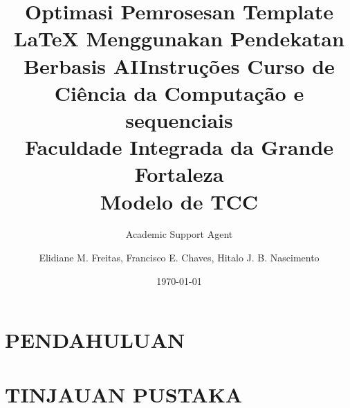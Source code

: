 \documentclass{article}
\title{Optimasi Pemrosesan Template LaTeX Menggunakan Pendekatan Berbasis AI}
\author{Academic Support Agent}
\date{\today}
\begin{document}
\maketitle

\begin{abstract}

\end{abstract}

\chapter{PENDAHULUAN}


\chapter{TINJAUAN PUSTAKA}



\usepackage{sbc-template}

\usepackage{graphicx,url}

\usepackage[brazil]{babel}   
\usepackage[utf8]{inputenc}  
\usepackage{verbatim}
\usepackage{listings}
\usepackage{xcolor}



\sloppy

\title{Instruções Curso de Ciência da Computação e sequenciais\\ Faculdade Integrada da Grande Fortaleza\\Modelo de TCC}

\author{Elidiane M. Freitas, Francisco E. Chaves, Hitalo J. B. Nascimento }


\address{Ciência da Computação -- Faculdade Integrada da Grande Fortaleza (FGF)\\
  Av. Porto Velho, 410 -- 60.510-040 -- Fortaleza -- Ce -- Brasil
}
\end{document}

